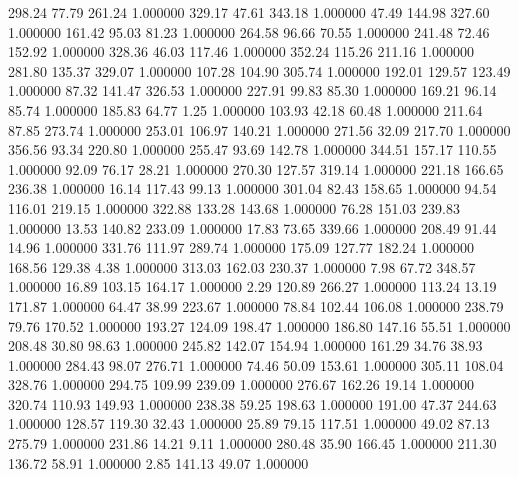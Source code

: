     298.24     77.79    261.24  1.000000
    329.17     47.61    343.18  1.000000
     47.49    144.98    327.60  1.000000
    161.42     95.03     81.23  1.000000
    264.58     96.66     70.55  1.000000
    241.48     72.46    152.92  1.000000
    328.36     46.03    117.46  1.000000
    352.24    115.26    211.16  1.000000
    281.80    135.37    329.07  1.000000
    107.28    104.90    305.74  1.000000
    192.01    129.57    123.49  1.000000
     87.32    141.47    326.53  1.000000
    227.91     99.83     85.30  1.000000
    169.21     96.14     85.74  1.000000
    185.83     64.77      1.25  1.000000
    103.93     42.18     60.48  1.000000
    211.64     87.85    273.74  1.000000
    253.01    106.97    140.21  1.000000
    271.56     32.09    217.70  1.000000
    356.56     93.34    220.80  1.000000
    255.47     93.69    142.78  1.000000
    344.51    157.17    110.55  1.000000
     92.09     76.17     28.21  1.000000
    270.30    127.57    319.14  1.000000
    221.18    166.65    236.38  1.000000
     16.14    117.43     99.13  1.000000
    301.04     82.43    158.65  1.000000
     94.54    116.01    219.15  1.000000
    322.88    133.28    143.68  1.000000
     76.28    151.03    239.83  1.000000
     13.53    140.82    233.09  1.000000
     17.83     73.65    339.66  1.000000
    208.49     91.44     14.96  1.000000
    331.76    111.97    289.74  1.000000
    175.09    127.77    182.24  1.000000
    168.56    129.38      4.38  1.000000
    313.03    162.03    230.37  1.000000
      7.98     67.72    348.57  1.000000
     16.89    103.15    164.17  1.000000
      2.29    120.89    266.27  1.000000
    113.24     13.19    171.87  1.000000
     64.47     38.99    223.67  1.000000
     78.84    102.44    106.08  1.000000
    238.79     79.76    170.52  1.000000
    193.27    124.09    198.47  1.000000
    186.80    147.16     55.51  1.000000
    208.48     30.80     98.63  1.000000
    245.82    142.07    154.94  1.000000
    161.29     34.76     38.93  1.000000
    284.43     98.07    276.71  1.000000
     74.46     50.09    153.61  1.000000
    305.11    108.04    328.76  1.000000
    294.75    109.99    239.09  1.000000
    276.67    162.26     19.14  1.000000
    320.74    110.93    149.93  1.000000
    238.38     59.25    198.63  1.000000
    191.00     47.37    244.63  1.000000
    128.57    119.30     32.43  1.000000
     25.89     79.15    117.51  1.000000
     49.02     87.13    275.79  1.000000
    231.86     14.21      9.11  1.000000
    280.48     35.90    166.45  1.000000
    211.30    136.72     58.91  1.000000
      2.85    141.13     49.07  1.000000
